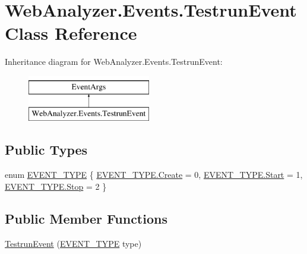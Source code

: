 \hypertarget{class_web_analyzer_1_1_events_1_1_testrun_event}{}\section{Web\+Analyzer.\+Events.\+Testrun\+Event Class Reference}
\label{class_web_analyzer_1_1_events_1_1_testrun_event}
Inheritance diagram for Web\+Analyzer.\+Events.\+Testrun\+Event\+:\begin{figure}[H]
\begin{center}
\leavevmode
\includegraphics[height=2.000000cm]{class_web_analyzer_1_1_events_1_1_testrun_event}
\end{center}
\end{figure}
\subsection*{Public Types}
\begin{DoxyCompactItemize}
\item 
enum \hyperlink{class_web_analyzer_1_1_events_1_1_testrun_event_a97dd88675eb3148f11919cc7e40d1850}{E\+V\+E\+N\+T\+\_\+\+T\+Y\+P\+E} \{ \hyperlink{class_web_analyzer_1_1_events_1_1_testrun_event_a97dd88675eb3148f11919cc7e40d1850a686e697538050e4664636337cc3b834f}{E\+V\+E\+N\+T\+\_\+\+T\+Y\+P\+E.\+Create} = 0, 
\hyperlink{class_web_analyzer_1_1_events_1_1_testrun_event_a97dd88675eb3148f11919cc7e40d1850aa6122a65eaa676f700ae68d393054a37}{E\+V\+E\+N\+T\+\_\+\+T\+Y\+P\+E.\+Start} = 1, 
\hyperlink{class_web_analyzer_1_1_events_1_1_testrun_event_a97dd88675eb3148f11919cc7e40d1850a11a755d598c0c417f9a36758c3da7481}{E\+V\+E\+N\+T\+\_\+\+T\+Y\+P\+E.\+Stop} = 2
 \}
\end{DoxyCompactItemize}
\subsection*{Public Member Functions}
\begin{DoxyCompactItemize}
\item 
\hyperlink{class_web_analyzer_1_1_events_1_1_testrun_event_a66e25aff631fec6d5d60e5e20a5bf94a}{Testrun\+Event} (\hyperlink{class_web_analyzer_1_1_events_1_1_testrun_event_a97dd88675eb3148f11919cc7e40d1850}{E\+V\+E\+N\+T\+\_\+\+T\+Y\+P\+E} type)
\end{DoxyCompactItemize}
